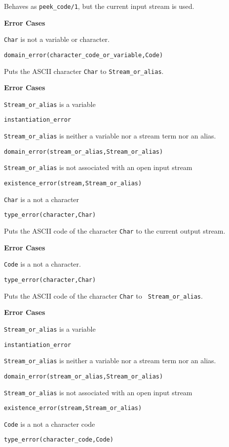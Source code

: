 \begin{description}
%
Behaves as {\tt peek\_code/1}, but the current input stream is used.

{\bf Error Cases}
\bi
\item 	{\tt Char} is not a variable or character.
\bi
\item 	{\tt domain\_error(character\_code\_or\_variable,Code)}
\ei
\ei


%
Puts the ASCII character {\tt Char} to {\tt Stream\_or\_alias}.

{\bf Error Cases}
\bi
\item 	{\tt Stream\_or\_alias} is a variable
\bi
\item {\tt instantiation\_error}
\ei
\item 	{\tt Stream\_or\_alias} is neither a variable nor a stream term nor an alias.
\bi
\item 	{\tt domain\_error(stream\_or\_alias,Stream\_or\_alias)}
\ei
\item 	{\tt Stream\_or\_alias} is not associated with an open input stream
\bi
\item 	{\tt existence\_error(stream,Stream\_or\_alias)}
\ei
\item 	{\tt Char} is a not a character
\bi
\item 	{\tt type\_error(character,Char)}
\ei
\ei

%
Puts the ASCII code of the character {\tt Char} to the current output
stream.

{\bf Error Cases}
\bi
\item 	{\tt Code} is a not a character.
\bi
\item 	{\tt type\_error(character,Char)}
\ei
\ei

%
Puts the ASCII code of the character {\tt Char} to {\tt
Stream\_or\_alias}.

{\bf Error Cases}
\bi
\item 	{\tt Stream\_or\_alias} is a variable
\bi
\item {\tt instantiation\_error}
\ei
\item 	{\tt Stream\_or\_alias} is neither a variable nor a stream term nor an alias.
\bi
\item 	{\tt domain\_error(stream\_or\_alias,Stream\_or\_alias)}
\ei
\item 	{\tt Stream\_or\_alias} is not associated with an open input stream
\bi
\item 	{\tt existence\_error(stream,Stream\_or\_alias)}
\ei
\item 	{\tt Code} is a not a character code
\bi
\item 	{\tt type\_error(character\_code,Code)}
\ei
\ei



\end{description}
